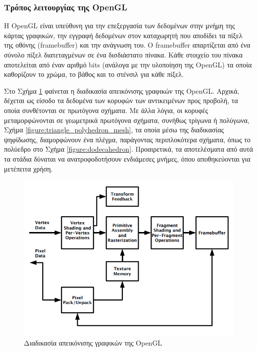 \subsubsection{Τρόπος λειτουργίας της OpenGL}
\label{section:opengl_framebuffer}
Η OpenGL είναι υπεύθυνη για την επεξεργασία των δεδομένων στην μνήμη της κάρτας γραφικών, την εγγραφή δεδομένων στον καταχωρητή που αποδίδει τα πίξελ της οθόνης (framebuffer) και την ανάγνωση του. Ο framebuffer απαρτίζεται από ένα σύνολο πίξελ διατεταγμένων σε ένα δισδιάστατο πίνακα. Κάθε στοιχείο του πίνακα αποτελείται από έναν αριθμό bits (ανάλογα με την υλοποίηση της OpenGL) τα οποία καθορίζουν το χρώμα, το βάθος και το στένσιλ για κάθε πίξελ.

Στο Σχήμα \ref{figure:opengl_pipeline} φαίνεται η διαδικασία απεικόνισης γραφικών της OpenGL. Αρχικά, δέχεται ως είσοδο τα δεδομένα των κορυφών των αντικειμένων προς προβολή, τα οποία συνθέτονται σε πρωτόγονα σχήματα. Με άλλα λόγια, οι κορυφές μεταμορφώνονται σε γεωμετρικά πρωτόγονα σχήματα, συνήθως τρίγωνα ή πολύγωνα, Σχήμα \ref{figure:triangle_polyhedron_mesh}, τα οποία μέσω της διαδικασίας ψηφίδωσης, διαμορφώνουν ένα πλέγμα, παράγοντας περιπλοκότερα σχήματα, όπως το πολύεδρο στο Σχήμα \ref{figure:dodecahedron}. Προαιρετικά, τα αποτελέσματα από αυτά τα στάδια δύναται να ανατροφοδοτήσουν ενδιάμεσες μνήμες, όπου αποθηκεύονται για μετέπειτα χρήση.

\begin{figure}[h]
	\centering
	\includegraphics[scale=2.2]{images/chapter2/opengl_pipeline.jpg}
	\caption{Διαδικασία απεικόνισης γραφικών της OpenGL}
	\label{figure:opengl_pipeline}
\end{figure}

